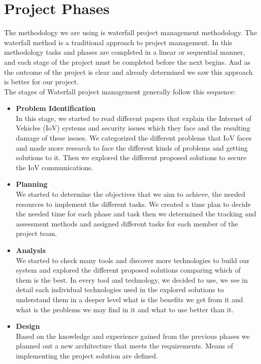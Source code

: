 	\section{Project Phases}
		\label{}
		The methodology we are using is waterfall project management methodology. The waterfall method is a traditional approach to project management. In this methodology tasks and phases are completed in a linear or sequential manner, and each stage of the project must be completed before the next begins. And as the outcome of the project is clear and already determined we saw this approach is better for our project. \\
		The stages of Waterfall project management generally follow this sequence: \\
		\begin{itemize}
			\item \textbf{Problem Identification}\\
			In this stage, we started to read different papers that explain the Internet of Vehicles (IoV) systems and security issues which they face and the resulting damage of these issues. We categorized the different problems that IoV faces and made more research to face the different kinds of problems and getting solutions to it. Then we explored the different proposed solutions to secure the IoV communications.\\
			\item \textbf{Planning}\\
			We started to determine the objectives that we aim to achieve, the needed resources to implement the different tasks. We created a time plan to decide the needed time for each phase and task then we determined the tracking and assessment methods and assigned different tasks for each member of the project team. 
			\item \textbf{Analysis}\\
			We started to check many tools and discover more technologies to build our system and explored the different proposed solutions comparing which of them is the best.  In every tool and technology, we decided to use, we see in detail each individual technologies used in the explored solutions  to understand them in a deeper level what is the benefits we get from it and what is the problems we may find in it and what to use better than it. 
			\item \textbf{Design}\\
			Based on the knowledge and experience gained from the previous phases we planned out a new architecture that meets the requirements. Means of implementing the project solution are defined. \\

\end{itemize}
